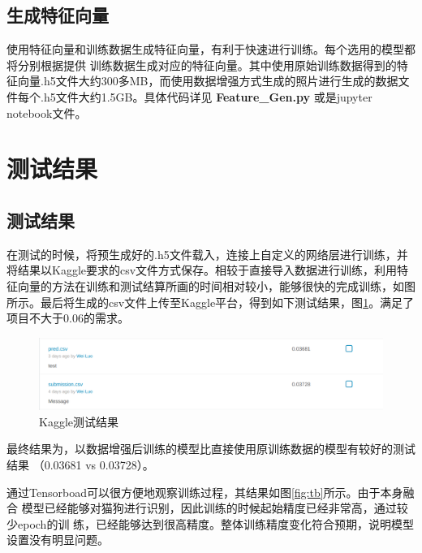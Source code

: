 \documentclass[a4paper,11pt]{article}
\begin{document}
\subsection{生成特征向量}
\label{sec:orgf7613d4}
使用特征向量和训练数据生成特征向量，有利于快速进行训练。每个选用的模型都将分别根据提供 训练数据生成对应的特征向量。其中使用原始训练数据得到的特征向量.h5文件大约300多MB，而使用数据增强方式生成的照片进行生成的数据文件每个.h5文件大约1.5GB。具体代码详见 \textbf{Feature\_Gen.py} 或是jupyter notebook文件。

\section{测试结果}
\label{sec:org8cf7f8d}
\subsection{测试结果}
\label{sec:org2f091fa}
在测试的时候，将预生成好的.h5文件载入，连接上自定义的网络层进行训练，并将结果以Kaggle要求的csv文件方式保存。相较于直接导入数据进行训练，利用特征向量的方法在训练和测试结算所画的时间相对较小，能够很快的完成训练，如图所示。最后将生成的csv文件上传至Kaggle平台，得到如下测试结果，图\ref{fig:kaggle}。满足了项目不大于0.06的需求。

\begin{figure}[htb]
\centering
\includegraphics[scale=0.25]{./figure/record.png}
\caption{Kaggle测试结果}
\label{fig:kaggle}
\end{figure}

最终结果为，以数据增强后训练的模型比直接使用原训练数据的模型有较好的测试结果
（0.03681 vs 0.03728）。

通过Tensorboad可以很方便地观察训练过程，其结果如图\ref{fig:tb}所示。由于本身融合
模型已经能够对猫狗进行识别，因此训练的时候起始精度已经非常高，通过较少epoch的训
练，已经能够达到很高精度。整体训练精度变化符合预期，说明模型设置没有明显问题。
\end{document}
